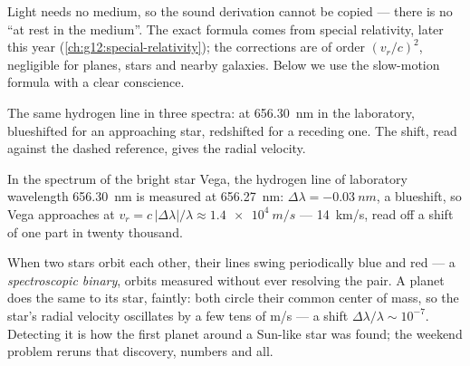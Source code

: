 \begin{remark}\label{rem:g12:doppler-effect:honest}
Light needs no medium, so the sound derivation cannot be copied --- there is no ``at rest
in the medium''. The exact formula comes from special relativity, later this year
(\cref{ch:g12:special-relativity}); the corrections are of order $(v_r/c)^2$, negligible for
planes, stars and nearby galaxies. Below we use the slow-motion formula with a clear conscience.
\end{remark}

\begin{omfigure}

{\small The same hydrogen line in three spectra: at \qty{656.30}{nm} in the laboratory,
blueshifted for an approaching star, redshifted for a receding one. The shift, read
against the dashed reference, gives the radial velocity.}
\end{omfigure}

\begin{example}\label{ex:g12:doppler-effect:vega}
In the spectrum of the bright star Vega, the hydrogen line of laboratory wavelength
\qty{656.30}{nm} is measured at \qty{656.27}{nm}: $\Delta\lambda = \qty{-0.03}{nm}$, a
blueshift, so Vega approaches at $v_r = c\,|\Delta\lambda|/\lambda \approx \qty{1.4e4}{m/s}$
--- \qty{14}{km/s}, read off a shift of one part in twenty thousand.
\end{example}

\begin{example}\label{ex:g12:doppler-effect:wobble}
When two stars orbit each other, their lines swing periodically blue and red --- a
\emph{spectroscopic binary}, orbits measured without ever resolving the pair. A planet does
the same to its star, faintly: both circle their common center of mass, so the star's radial
velocity oscillates by a few tens of \unit{m/s} --- a shift $\Delta\lambda/\lambda \sim 10^{-7}$.
Detecting it is how the first planet around a Sun-like star was found; the weekend problem
reruns that discovery, numbers and all.
\end{example}

